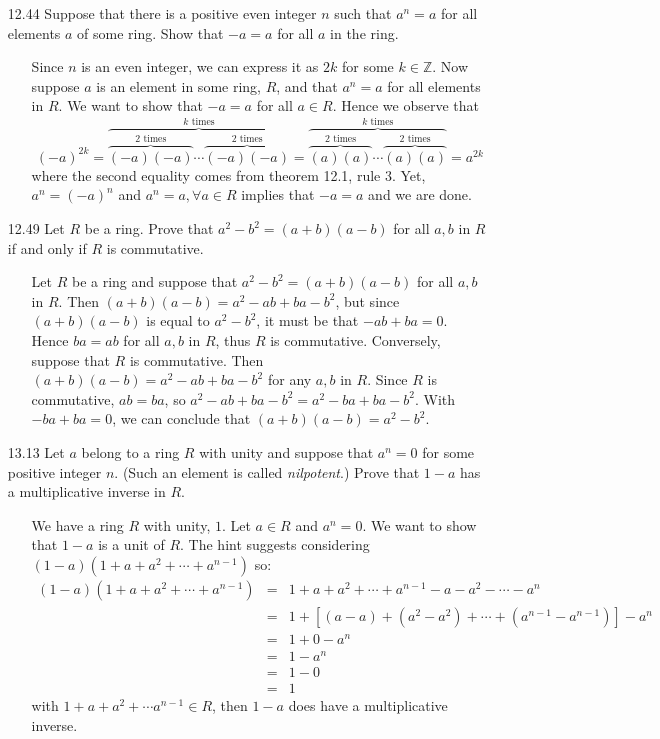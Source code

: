 \documentclass[12pt]{article}
\begin{document}
\begin{enumerate}
\item[12.44] Suppose that there is a positive even integer $n$ such that $a^n = a$ for all elements $a$ of
some ring. Show that $-a = a$ for all $a$ in the ring.
\begin{enumerate}
\item[] Since $n$ is an even integer, we can express it as $2k$ for some $k \in \mathbb{Z}$. Now
suppose $a$ is an element in some ring, $R$, and that $a^n = a$ for all elements in $R$. We want to 
show that $-a = a$ for all $a \in R$. Hence we observe that 
\[ (-a)^{2k} = \overbrace{\overbrace{(-a)(-a)}^{\mbox{$2$ times}}\cdots 
\overbrace{(-a)(-a)}^{\mbox{$2$ times}}}^{\mbox{$k$ times}} = \overbrace{\overbrace{(a)(a)}^{\mbox{$2$ times}}\cdots
\overbrace{(a)(a)}^{\mbox{$2$ times}}}^{\mbox{$k$ times}} = a^{2k}
\]
where the second equality comes from theorem 12.1, rule 3. Yet, $a^n = (-a)^n$ and $a^n = a, \forall a \in R$ 
implies that $-a = a$ and we are done.
\end{enumerate}

\item[12.49] Let $R$ be a ring. Prove that $a^2 - b^2 = (a + b)(a - b)$ for all $a, b$ in $R$
if and only if $R$ is commutative.
\begin{enumerate}
\item[] Let $R$ be a ring and suppose that $a^2 - b^2 = (a + b)(a - b)$ for all $a, b$ in $R$. Then
$(a + b)(a - b) = a^2 - ab + ba - b^2$, but since $(a + b)(a - b)$ is equal to $a^2 - b^2$, it must
be that $-ab + ba = 0$. Hence $ba = ab$ for all $a, b$ in $R$, thus $R$ is commutative. Conversely,
suppose that $R$ is commutative. Then $(a + b)(a - b) = a^2 - ab + ba - b^2$ for any $a, b$ in $R$.
Since $R$ is commutative, $ab = ba$, so $a^2 - ab + ba - b^2 = a^2 - ba + ba - b^2$. With 
$-ba + ba = 0$, we can conclude that $(a + b)(a - b) = a^2 - b^2$.
\end{enumerate}

\item[13.13] Let $a$ belong to a ring $R$ with unity and suppose that $a^n = 0$ for some positive integer $n$.
(Such an element is called \emph{nilpotent}.) Prove that $1 - a$ has a multiplicative inverse in $R$.
\begin{enumerate}
\item[] We have a ring $R$ with unity, $1$. Let $a \in R$ and $a^n = 0$. We want to show that $1 - a$ is a unit of $R$.
The hint suggests considering $(1 - a)(1 + a + a^2 + \cdots + a^{n-1})$ so:
\begin{eqnarray*}
(1 - a)(1 + a + a^2 + \cdots + a^{n-1})&=& 1 + a + a^2 + \cdots + a^{n-1} - a - a^2 - \cdots - a^n \\
&=& 1 + [(a - a) + (a^2 - a^2) + \cdots + (a^{n-1} - a^{n-1})] - a^n \\
&=& 1 + 0 - a^n \\
&=& 1 - a^n \\
&=& 1 - 0 \\
&=& 1
\end{eqnarray*}
with $1 + a + a^2 + \cdots a^{n-1} \in R$, then $1 - a$ does have a multiplicative inverse.
\end{enumerate}


\end{enumerate}
\end{document}
